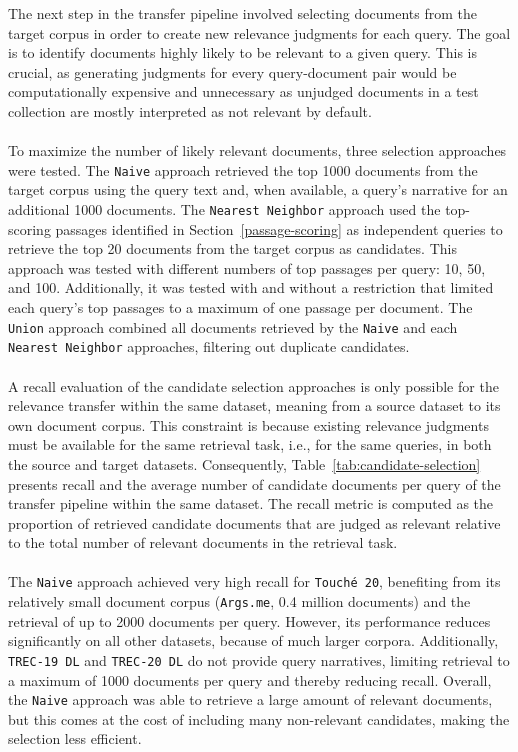 The next step in the transfer pipeline involved selecting documents from the target corpus in order to create new relevance judgments for each query. The goal is to identify documents highly likely to be relevant to a given query. This is crucial, as generating judgments for every query-document pair would be computationally expensive and unnecessary as unjudged documents in a test collection are mostly interpreted as not relevant by default.
\\\\
To maximize the number of likely relevant documents, three selection approaches were tested. The \texttt{Naive} approach retrieved the top 1000 documents from the target corpus using the query text and, when available, a query's narrative for an additional 1000 documents. The \texttt{Nearest Neighbor} approach used the top-scoring passages identified in Section~\ref{passage-scoring} as independent queries to retrieve the top 20 documents from the target corpus as candidates. This approach was tested with different numbers of top passages per query: 10, 50, and 100. Additionally, it was tested with and without a restriction that limited each query's top passages to a maximum of one passage per document. The \texttt{Union} approach combined all documents retrieved by the \texttt{Naive} and each \texttt{Nearest Neighbor} approaches, filtering out duplicate candidates.
\\\\
A recall evaluation of the candidate selection approaches is only possible for the relevance transfer within the same dataset, meaning from a source dataset to its own document corpus. This constraint is because existing relevance judgments must be available for the same retrieval task, i.e., for the same queries, in both the source and target datasets. Consequently, Table~\ref{tab:candidate-selection} presents recall and the average number of candidate documents per query of the transfer pipeline within the same dataset. The recall metric is computed as the proportion of retrieved candidate documents that are judged as relevant relative to the total number of relevant documents in the retrieval task.
\\\\
The \texttt{Naive} approach achieved very high recall for \texttt{Touché 20}, benefiting from its relatively small document corpus (\texttt{Args.me}, 0.4 million documents) and the retrieval of up to 2000 documents per query. However, its performance reduces significantly on all other datasets, because of much larger corpora. Additionally, \texttt{TREC-19 DL} and \texttt{TREC-20 DL} do not provide query narratives, limiting retrieval to a maximum of 1000 documents per query and thereby reducing recall. Overall, the \texttt{Naive} approach was able to retrieve a large amount of relevant documents, but this comes at the cost of including many non-relevant candidates, making the selection less efficient.
